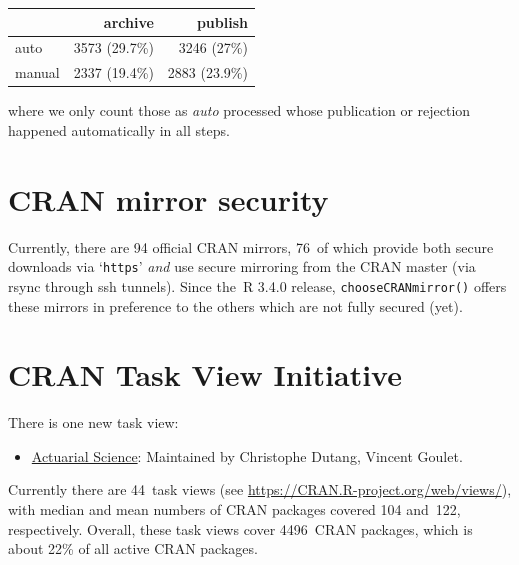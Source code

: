 \begin{longtable}[]{@{}lrr@{}}
\toprule\noalign{}
& archive & publish \\
\midrule\noalign{}
\endhead
\bottomrule\noalign{}
\endlastfoot
auto & 3573 (29.7\%) & 3246 (27\%) \\
manual & 2337 (19.4\%) & 2883 (23.9\%) \\
\end{longtable}

\noindent where we only count those as \emph{auto} processed whose publication or
rejection happened automatically in all steps.

\hypertarget{cran-mirror-security}{%
\section{CRAN mirror security}\label{cran-mirror-security}}

Currently, there are 94 official CRAN mirrors,
76~of which provide both
secure downloads via `\texttt{https}' \emph{and} use secure mirroring from the CRAN master
(via rsync through ssh tunnels). Since the~R 3.4.0 release, \texttt{chooseCRANmirror()}
offers these mirrors in preference to the others which are not fully secured (yet).

\hypertarget{cran-task-view-initiative}{%
\section{CRAN Task View Initiative}\label{cran-task-view-initiative}}

There is one new task view:

\begin{itemize}
\tightlist
\item
  \href{https://CRAN.R-project.org/view=ActuarialScience}{Actuarial Science}: Maintained by Christophe Dutang, Vincent Goulet.
\end{itemize}

Currently there are 44~task views (see \url{https://CRAN.R-project.org/web/views/}),
with median and mean numbers of CRAN packages covered
104 and~122, respectively.
Overall, these task views cover 4496~CRAN packages,
which is about 22\% of all active CRAN packages.


\address{%
Kurt Hornik\\
WU Wirtschaftsuniversität Wien\\%
Austria\\
%
%
\textit{ORCiD: \href{https://orcid.org/0000-0003-4198-9911}{0000-0003-4198-9911}}\\%
\href{mailto:Kurt.Hornik@R-project.org}{\nolinkurl{Kurt.Hornik@R-project.org}}%
}

